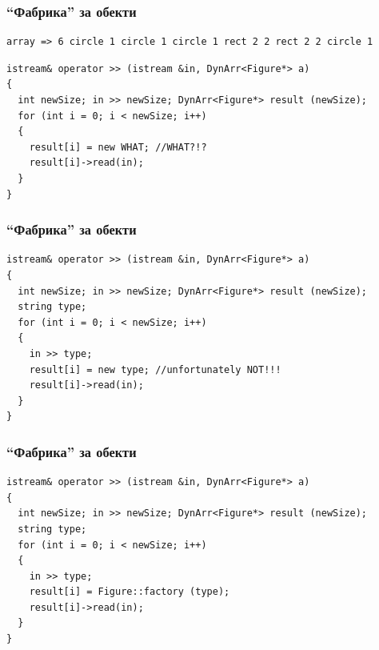 \documentclass{beamer}
\begin{document}
\begin{frame}[fragile]
\frametitle{``Фабрика'' за обекти}


\begin{flushleft}
\begin{lstlisting}
array => 6 circle 1 circle 1 circle 1 rect 2 2 rect 2 2 circle 1
\end{lstlisting}
\end{flushleft}

\begin{flushleft}
\begin{lstlisting}
istream& operator >> (istream &in, DynArr<Figure*> a)
{
  int newSize; in >> newSize; DynArr<Figure*> result (newSize);
  for (int i = 0; i < newSize; i++)
  {
    result[i] = new WHAT; //WHAT?!?
    result[i]->read(in);
  }
}
\end{lstlisting}
\end{flushleft}


\end{frame}







\begin{frame}[fragile]
\frametitle{``Фабрика'' за обекти}


\begin{flushleft}
\begin{lstlisting}
istream& operator >> (istream &in, DynArr<Figure*> a)
{
  int newSize; in >> newSize; DynArr<Figure*> result (newSize);
  string type;
  for (int i = 0; i < newSize; i++)
  {
    in >> type;
    result[i] = new type; //unfortunately NOT!!!
    result[i]->read(in);
  }
}
\end{lstlisting}
\end{flushleft}



\end{frame}

\begin{frame}[fragile]
\frametitle{``Фабрика'' за обекти}


\begin{flushleft}
\begin{lstlisting}
istream& operator >> (istream &in, DynArr<Figure*> a)
{
  int newSize; in >> newSize; DynArr<Figure*> result (newSize);
  string type;
  for (int i = 0; i < newSize; i++)
  {
    in >> type;
    result[i] = Figure::factory (type);
    result[i]->read(in);
  }
}
\end{lstlisting}
\end{flushleft}


\end{frame}
\end{document}
